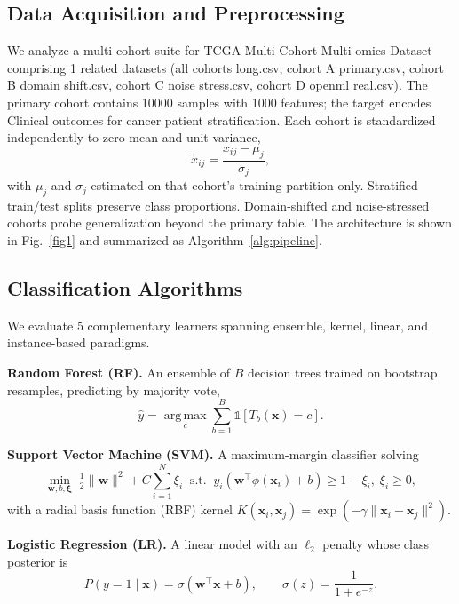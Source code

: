 \documentclass[conference]{IEEEtran}
\begin{document}
\subsection{Data Acquisition and Preprocessing}
We analyze a multi-cohort suite for TCGA Multi-Cohort Multi-omics Dataset comprising 1 related datasets
(all cohorts long.csv, cohort A primary.csv, cohort B domain shift.csv, cohort C noise stress.csv, cohort D openml real.csv). The primary cohort contains 10000 samples with 1000 features;
the target encodes Clinical outcomes for cancer patient stratification. Each cohort is standardized independently to zero mean and unit
variance,
\begin{equation}
\tilde{x}_{ij} = \frac{x_{ij}-\mu_j}{\sigma_j},
\end{equation}
with $\mu_j$ and $\sigma_j$ estimated on that cohort's training partition only. Stratified
train/test splits preserve class proportions. Domain-shifted and noise-stressed cohorts probe
generalization beyond the primary table. The architecture is shown in Fig.~\ref{fig1} and
summarized as Algorithm~\ref{alg:pipeline}.



\subsection{Classification Algorithms}
We evaluate 5 complementary learners spanning ensemble, kernel, linear, and
instance-based paradigms.

\textbf{Random Forest (RF).} An ensemble of $B$ decision trees trained on bootstrap resamples,
predicting by majority vote,
\begin{equation}
\hat{y}=\operatorname*{arg\,max}_{c}\sum_{b=1}^{B}\mathbb{1}\!\left[T_b(\mathbf{x})=c\right].
\end{equation}

\textbf{Support Vector Machine (SVM).} A maximum-margin classifier solving
\begin{equation}
\min_{\mathbf{w},b,\boldsymbol{\xi}}\; \tfrac{1}{2}\lVert\mathbf{w}\rVert^{2}+C\sum_{i=1}^{N}\xi_i
\;\; \text{s.t.}\;\; y_i(\mathbf{w}^{\top}\phi(\mathbf{x}_i)+b)\geq 1-\xi_i,\; \xi_i\geq 0,
\end{equation}
with a radial basis function (RBF) kernel
$K(\mathbf{x}_i,\mathbf{x}_j)=\exp(-\gamma\lVert\mathbf{x}_i-\mathbf{x}_j\rVert^{2})$.

\textbf{Logistic Regression (LR).} A linear model with an $\ell_2$ penalty whose class posterior is
\begin{equation}
P(y=1\mid\mathbf{x})=\sigma(\mathbf{w}^{\top}\mathbf{x}+b),\qquad \sigma(z)=\frac{1}{1+e^{-z}}.
\end{equation}
\end{document}

